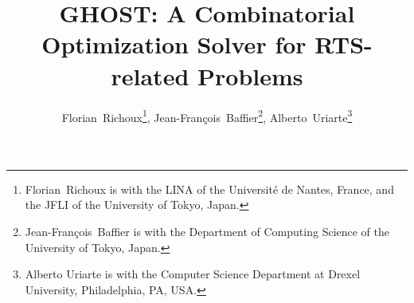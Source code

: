 \documentclass[journal]{IEEEtran}
\newcommand{\ghost}{\textsc{GHOST}\xspace}
\begin{document}
%
\title{\ghost: A Combinatorial Optimization Solver for RTS-related Problems}
%
%
%


\author{Florian~Richoux\thanks{Florian~Richoux is with the LINA of the Universit{\'e} de Nantes, France, and the JFLI of the University of Tokyo, Japan.},
        Jean-Fran{\c c}ois~Baffier\thanks{Jean-Fran{\c c}ois~Baffier is with the Department of Computing Science of the University of Tokyo, Japan.},
        Alberto~Uriarte\thanks{Alberto Uriarte is with the Computer Science Department at Drexel University, Philadelphia, PA, USA.}}



% 
%
\end{document}
